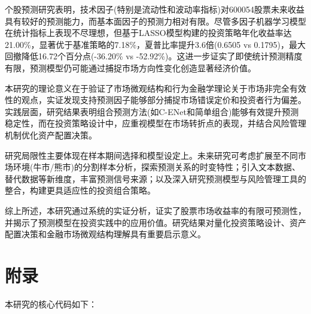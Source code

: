 \documentclass[12pt, a4paper]{article}
\begin{document}
个股预测研究表明，技术因子(特别是流动性和波动率指标)对600054股票未来收益具有较好的预测能力，而基本面因子的预测力相对有限。尽管多因子机器学习模型在统计指标上表现不尽理想，但基于LASSO模型构建的投资策略年化收益率达21.00\%，显著优于基准策略的7.18\%，夏普比率提升3.6倍(0.6505 vs 0.1795)，最大回撤降低16.72个百分点(-36.20\% vs -52.92\%)。这进一步证实了即使统计预测精度有限，预测模型仍可能通过捕捉市场方向性变化创造显著经济价值。

本研究的理论意义在于验证了市场微观结构和行为金融学理论关于市场非完全有效性的观点，实证发现支持预测因子能够部分捕捉市场错误定价和投资者行为偏差。实践层面，研究结果表明组合预测方法(如C-ENet和简单组合)能够有效提升预测稳定性，而在投资策略设计中，应重视模型在市场转折点的表现，并结合风险管理机制优化资产配置决策。

研究局限性主要体现在样本期间选择和模型设定上。未来研究可考虑扩展至不同市场环境(牛市/熊市)的分割样本分析，探索预测关系的时变特性；引入文本数据、替代数据等新维度，丰富预测信号来源；以及深入研究预测模型与风险管理工具的整合，构建更具适应性的投资组合策略。

综上所述，本研究通过系统的实证分析，证实了股票市场收益率的有限可预测性，并揭示了预测模型在投资实践中的应用价值。研究结果对量化投资策略设计、资产配置决策和金融市场微观结构理解具有重要启示意义。
\printbibliography[title=参考文献]

\section{附录}

本研究的核心代码如下：
\end{document}
